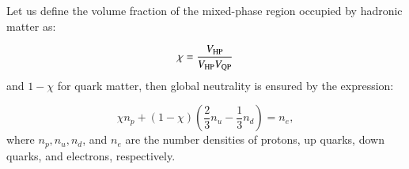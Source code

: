 \documentclass[main.tex]{subfiles}
\begin{document}
    Let us define the volume fraction of the mixed-phase region occupied by hadronic matter as:

    \begin{equation}
        \chi = \frac{V_{\rm HP}}{V_{\rm HP} V_{\rm QP}}
    \end{equation}
    and $1-\chi$ for quark matter, then global neutrality is ensured by the expression:

    \begin{equation}
        \chi n_p + (1-\chi)\left(\frac{2}{3} n_u - \frac{1}{3}n_d \right) = n_e,
    \end{equation}
    where $n_p, n_u, n_d$, and $n_e$ are the number densities of protons, up quarks, down quarks, and electrons, respectively.


    




\end{document}
